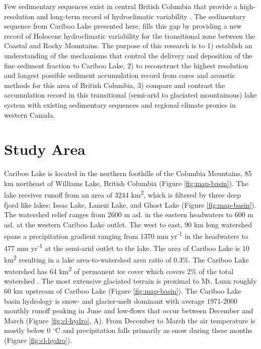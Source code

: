 \documentclass[Royal,times,doublespace,sageh]{sagej}
\begin{document}
Few sedimentary sequences exist in central British Columbia that provide
a high-resolution and long-term record of hydroclimatic variability
\citep{Gilbert2012, Hodder2006b, Menounos2009b, Maurer2012b}. The
sedimentary sequence from Cariboo Lake presented here, fills this gap by
providing a new record of Holocene hydroclimatic variability for the
transitional zone between the Coastal and Rocky Mountains. The purpose
of this research is to 1) establish an understanding of the mechanisms
that control the delivery and deposition of the fine sediment fraction
to Cariboo Lake, 2) to reconstruct the highest resolution and longest
possible sediment accumulation record from cores and acoustic methods
for this area of British Columbia, 3) compare and contrast the
accumulation record in this transitional (semi-arid to glaciated
mountainous) lake system with existing sedimentary sequences and
regional climate proxies in western Canada.

\hypertarget{study-area}{%
\section{Study Area}\label{study-area}}

Cariboo Lake is located in the northern foothills of the Columbia
Mountains, 85 km northeast of Williams Lake, British Columbia (Figure
\ref{fig:map-basin}). The lake receives runoff from an area of 3244
km\textsuperscript{2}, which is filtered by three deep fjord like lakes:
Issac Lake, Lanezi Lake, and Ghost Lake (Figure \ref{fig:map-basin}).
The watershed relief ranges from 2600 m asl. in the eastern headwaters
to 600 m asl. at the western Cariboo Lake outlet. The west to east, 90
km long watershed spans a precipitation gradient ranging from 1370 mm
yr\textsuperscript{-1} in the headwaters to 477 mm
yr\textsuperscript{-1} at the semi-arid outlet to the lake. The area of
Cariboo Lake is 10 km\textsuperscript{2} resulting in a lake
area-to-watershed area ratio of 0.3\%. The Cariboo Lake watershed has 64
km\textsuperscript{2} of permanent ice cover which covers 2\% of the
total watershed \citep{Bolch2008}. The most extensive glaciated terrain
is proximal to Mt. Lunn roughly 60 km upstream of Cariboo Lake (Figure
\ref{fig:map-basin}). The Cariboo Lake basin hydrology is snow- and
glacier-melt dominant with average 1971-2000 monthly runoff peaking in
June and low-flows that occur between December and March (Figure
\ref{fig:cl-hydro}, A). From December to March the air temperature is
mostly below 0 \(^{\circ}\)C and precipitation falls primarily as snow
during these months (Figure \ref{fig:cl-hydro}).
\end{document}
